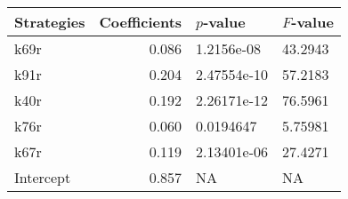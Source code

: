 \begin{tabular}{lrll}
\toprule
Strategies &  Coefficients &    $p$-value & $F$-value \\
\midrule
      k69r &         0.086 &   1.2156e-08 &   43.2943 \\
      k91r &         0.204 &  2.47554e-10 &   57.2183 \\
      k40r &         0.192 &  2.26171e-12 &   76.5961 \\
      k76r &         0.060 &    0.0194647 &   5.75981 \\
      k67r &         0.119 &  2.13401e-06 &   27.4271 \\
 Intercept &         0.857 &           NA &        NA \\
\bottomrule
\end{tabular}
